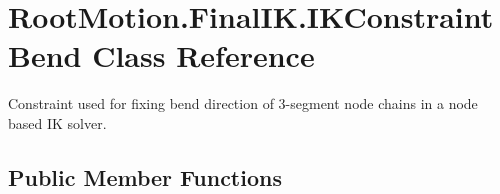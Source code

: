 \hypertarget{class_root_motion_1_1_final_i_k_1_1_i_k_constraint_bend}{}\section{Root\+Motion.\+Final\+I\+K.\+I\+K\+Constraint\+Bend Class Reference}
\label{class_root_motion_1_1_final_i_k_1_1_i_k_constraint_bend}


Constraint used for fixing bend direction of 3-\/segment node chains in a node based IK solver.  


\subsection*{Public Member Functions}
